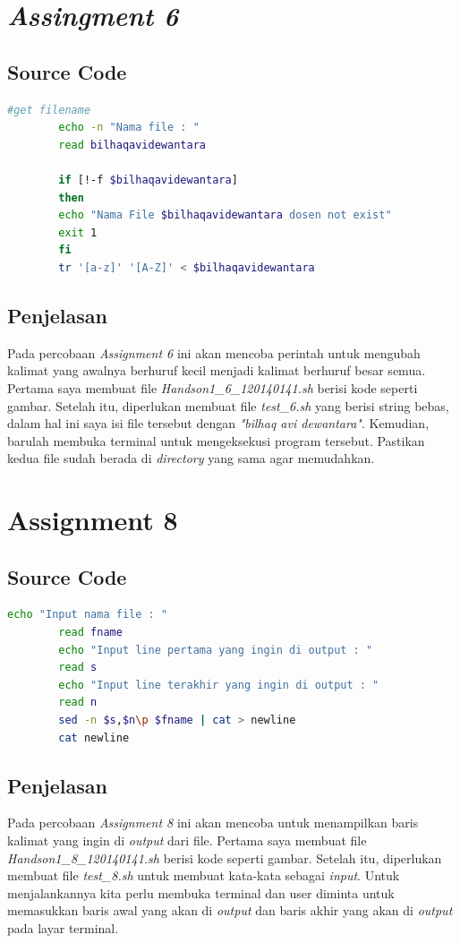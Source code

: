 \documentclass[11pt,a4paper]{article}
\begin{document}
\section{\textit{Assingment 6}}
\subsection*{Source Code}
\begin{lstlisting}[language=bash]
		#get filename
		echo -n "Nama file : "
		read bilhaqavidewantara

		if [!-f $bilhaqavidewantara]
		then
		echo "Nama File $bilhaqavidewantara dosen not exist"
		exit 1
		fi
		tr '[a-z]' '[A-Z]' < $bilhaqavidewantara 
	\end{lstlisting}
	
\subsection*{Penjelasan}
	Pada percobaan \textit{Assignment 6} ini akan mencoba perintah untuk mengubah kalimat yang awalnya berhuruf kecil menjadi 
	kalimat berhuruf besar semua. Pertama saya membuat file \textit{Handson1\_6\_120140141.sh} berisi kode seperti gambar.
	Setelah itu, diperlukan membuat file \textit{test\_6.sh} yang berisi string bebas, dalam hal ini saya isi file tersebut dengan 
	\textit{"bilhaq avi dewantara"}. Kemudian, barulah membuka terminal untuk mengeksekusi program tersebut.
	Pastikan kedua file sudah berada di \textit{directory} yang sama agar memudahkan.
	
	
\section{Assignment 8}
\subsection*{Source Code}
\begin{lstlisting}[language=bash]
		echo "Input nama file : "
		read fname
		echo "Input line pertama yang ingin di output : "
		read s
		echo "Input line terakhir yang ingin di output : "
		read n
		sed -n $s,$n\p $fname | cat > newline
		cat newline
\end{lstlisting}

\subsection*{Penjelasan}
	Pada percobaan \textit{Assignment 8} ini akan mencoba untuk menampilkan baris kalimat yang ingin di \textit{output} dari file.
	Pertama saya membuat file \textit{Handson1\_8\_120140141.sh} berisi kode seperti gambar. Setelah itu, diperlukan membuat file \textit{test\_8.sh}
	untuk membuat kata-kata sebagai \textit{input}. Untuk menjalankannya kita perlu membuka terminal dan user diminta untuk memasukkan 
	baris awal yang akan di \textit{output} dan baris akhir yang akan di \textit{output} pada layar terminal.
\end{document}
